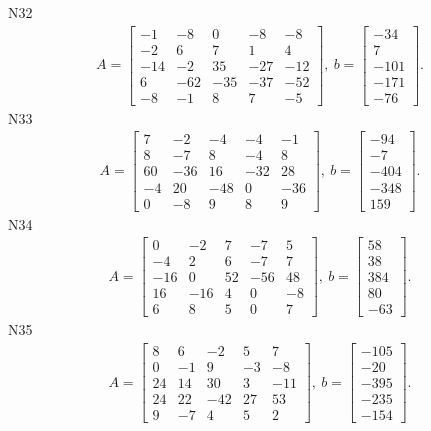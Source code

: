 \documentclass[11pt]{report}
\begin{document}
N32
\begin{align*}
 A = \left[\begin{matrix}-1 & -8 & 0 & -8 & -8\\-2 & 6 & 7 & 1 & 4\\-14 & -2 & 35 & -27 & -12\\6 & -62 & -35 & -37 & -52\\-8 & -1 & 8 & 7 & -5\end{matrix}\right],
\ b = \left[\begin{matrix}-34\\7\\-101\\-171\\-76\end{matrix}\right]. 
 \end{align*}
N33
\begin{align*}
 A = \left[\begin{matrix}7 & -2 & -4 & -4 & -1\\8 & -7 & 8 & -4 & 8\\60 & -36 & 16 & -32 & 28\\-4 & 20 & -48 & 0 & -36\\0 & -8 & 9 & 8 & 9\end{matrix}\right],
\ b = \left[\begin{matrix}-94\\-7\\-404\\-348\\159\end{matrix}\right]. 
 \end{align*}
N34
\begin{align*}
 A = \left[\begin{matrix}0 & -2 & 7 & -7 & 5\\-4 & 2 & 6 & -7 & 7\\-16 & 0 & 52 & -56 & 48\\16 & -16 & 4 & 0 & -8\\6 & 8 & 5 & 0 & 7\end{matrix}\right],
\ b = \left[\begin{matrix}58\\38\\384\\80\\-63\end{matrix}\right]. 
 \end{align*}
N35
\begin{align*}
 A = \left[\begin{matrix}8 & 6 & -2 & 5 & 7\\0 & -1 & 9 & -3 & -8\\24 & 14 & 30 & 3 & -11\\24 & 22 & -42 & 27 & 53\\9 & -7 & 4 & 5 & 2\end{matrix}\right],
\ b = \left[\begin{matrix}-105\\-20\\-395\\-235\\-154\end{matrix}\right]. 
 \end{align*}
\end{document}
